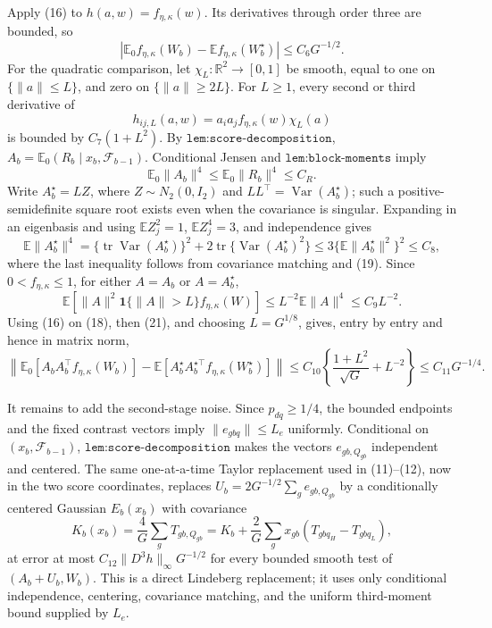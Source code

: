 Apply (16) to \(h(a,w)=f_{\eta,\kappa}(w)\).  Its derivatives through order three are bounded, so
\[
 \left|\mathbb E_0f_{\eta,\kappa}(W_b)
       -\mathbb Ef_{\eta,\kappa}(W_b^\star)\right|
 \leq C_6G^{-1/2}.                                                        \tag{17}
\]
For the quadratic comparison, let \(\chi_L:\mathbb R^2\to[0,1]\) be smooth, equal to one on \(\{\|a\|\leq L\}\), and zero on \(\{\|a\|\geq2L\}\).  For \(L\geq1\), every second or third derivative of
\[
 h_{ij,L}(a,w)=a_ia_jf_{\eta,\kappa}(w)\chi_L(a)                        \tag{18}
\]
is bounded by \(C_7(1+L^2)\).  By \(\texttt{lem:score-decomposition}\),
\(
 A_b=\mathbb E_0(R_b\mid x_b,\mathcal F_{b-1})
\).  Conditional Jensen and \(\texttt{lem:block-moments}\) imply
\[
 \mathbb E_0\|A_b\|^4\leq\mathbb E_0\|R_b\|^4\leq C_R.               \tag{19}
\]
Write \(A_b^\star=LZ\), where \(Z\sim N_2(0,I_2)\) and \(LL^\top=\operatorname{Var}(A_b^\star)\); such a positive-semidefinite square root exists even when the covariance is singular.  Expanding in an eigenbasis and using \(\mathbb EZ_j^2=1\), \(\mathbb EZ_j^4=3\), and independence gives
\[
 \mathbb E\|A_b^\star\|^4
 =\{\operatorname{tr}\operatorname{Var}(A_b^\star)\}^2
   +2\operatorname{tr}\{\operatorname{Var}(A_b^\star)^2\}
 \leq3\{\mathbb E\|A_b^\star\|^2\}^2\leq C_8,                       \tag{20}
\]
where the last inequality follows from covariance matching and (19).  Since \(0<f_{\eta,\kappa}\leq1\), for either \(A=A_b\) or \(A=A_b^\star\),
\[
 \mathbb E\!\left[\|A\|^2\mathbf1\{\|A\|>L\}
                   f_{\eta,\kappa}(W)\right]
 \leq L^{-2}\mathbb E\|A\|^4\leq C_9L^{-2}.                           \tag{21}
\]
Using (16) on (18), then (21), and choosing \(L=G^{1/8}\), gives, entry by entry and hence in matrix norm,
\[
 \left\|\mathbb E_0[A_bA_b^\top f_{\eta,\kappa}(W_b)]
 -\mathbb E[A_b^\star A_b^{\star\top}f_{\eta,\kappa}(W_b^\star)]
 \right\|
 \leq C_{10}\left\{\frac{1+L^2}{\sqrt G}+L^{-2}\right\}
 \leq C_{11}G^{-1/4}.                                                     \tag{22}
\]

It remains to add the second-stage noise.  Since \(p_{dq}\geq1/4\), the bounded endpoints and the fixed contrast vectors imply \(\|e_{gbq}\|\leq L_e\) uniformly.  Conditional on \((x_b,\mathcal F_{b-1})\), \(\texttt{lem:score-decomposition}\) makes the vectors \(e_{gb,Q_{gb}}\) independent and centered.  The same one-at-a-time Taylor replacement used in (11)--(12), now in the two score coordinates, replaces
\(
 U_b=2G^{-1/2}\sum_ge_{gb,Q_{gb}}
\)
by a conditionally centered Gaussian \(E_b(x_b)\) with covariance
\[
 K_b(x_b)=\frac4G\sum_gT_{gb,Q_{gb}}
 =K_b+\frac2G\sum_gx_{gb}(T_{gbq_H}-T_{gbq_L}),                         \tag{23}
\]
at error at most \(C_{12}\|D^3h\|_\infty G^{-1/2}\) for every bounded smooth test of \((A_b+U_b,W_b)\).  This is a direct Lindeberg replacement; it uses only conditional independence, centering, covariance matching, and the uniform third-moment bound supplied by \(L_e\).

